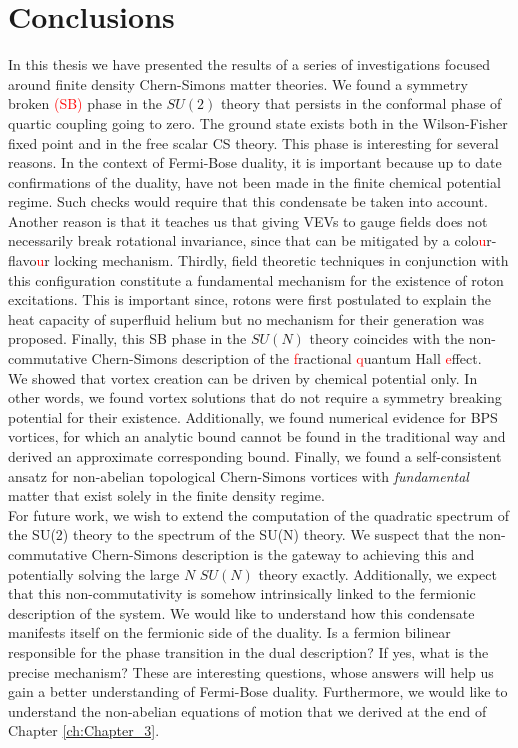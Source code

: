 
\chapter*{Conclusions}

    In this thesis we have presented the results of a series of investigations focused around finite density Chern-Simons matter theories. We found a symmetry broken \textcolor{red}{(SB)} phase in the $SU(2)$ theory that persists in the conformal phase of quartic coupling going to zero. The ground state exists both in the Wilson-Fisher fixed point and in the free scalar CS theory. This phase is interesting for several reasons. In the context of Fermi-Bose duality, it is important because up to date confirmations of the duality, have not been made in the finite chemical potential regime. Such checks would require that this condensate be taken into account. Another reason is that it teaches us that giving VEVs to gauge fields does not necessarily break rotational invariance, since that can be mitigated by a colo\textcolor{red}{u}r-flavo\textcolor{red}{u}r locking mechanism. Thirdly, field theoretic techniques in conjunction with this configuration constitute a fundamental mechanism for the existence of roton excitations. This is important since, rotons were first postulated to explain the heat capacity of superfluid helium \textcolor{red}{\cite{PhysRev.60.356}} but no mechanism for their generation was proposed. Finally, this SB phase in the $SU(N)$ theory coincides with the non-commutative Chern-Simons description of the \textcolor{red}{f}ractional \textcolor{red}{q}uantum Hall \textcolor{red}{e}ffect.\\
    \indent We showed that vortex creation can be driven by chemical potential only. In other words, we found vortex solutions that do not require a symmetry breaking potential for their existence. Additionally, we found numerical evidence for BPS vortices, for which an analytic bound cannot be found in the traditional way and derived an approximate corresponding bound. Finally, we found a self-consistent ansatz for non-abelian topological Chern-Simons vortices with \textit{fundamental} matter that exist solely in the finite density regime.\\
    \indent For future work, we wish to extend the computation of the quadratic spectrum of the SU(2) theory to the spectrum of the SU(N) theory. We suspect that the non-commutative Chern-Simons description is the gateway to achieving this and potentially solving the large $N$ $SU(N)$ theory exactly. Additionally, we expect that this non-commutativity is somehow intrinsically linked to the fermionic description of the system. We would like to understand how this condensate manifests itself on the fermionic side of the duality. Is a fermion bilinear responsible for the phase transition in the dual description? If yes, what is the precise mechanism? These are interesting questions, whose answers will help us gain a better understanding of Fermi-Bose duality. Furthermore, we would like to understand the non-abelian equations of motion that we derived at the end of Chapter \ref{ch:Chapter_3}.\\
